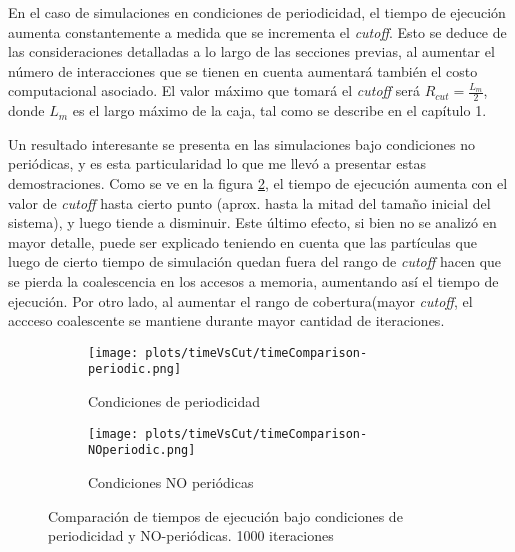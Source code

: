 En el caso de simulaciones en condiciones de periodicidad, el tiempo de ejecución aumenta constantemente a medida que se incrementa el \textit{cutoff}. 
Esto se deduce de las consideraciones detalladas a lo largo de las secciones previas, al aumentar el número de interacciones que se tienen en cuenta aumentará también el costo computacional asociado.
El valor máximo que tomará el \textit{cutoff} será $R_{cut}=\frac{L_m}{2}$, donde $L_m$ es el largo máximo de la caja, tal como se describe en el capítulo 1.

Un resultado interesante se presenta en las simulaciones bajo condiciones no periódicas, y es esta particularidad lo que me llevó a presentar estas demostraciones.
Como se ve en la figura \ref{time-vs-cut-NOperiodic}, el tiempo de ejecución aumenta con el valor de \textit{cutoff} hasta cierto punto (aprox. hasta la mitad del tamaño inicial del sistema), y luego tiende a disminuir.
Este último efecto, si bien no se analizó en mayor detalle, puede ser explicado teniendo en cuenta que las partículas que luego de cierto tiempo de simulación quedan fuera del rango de \textit{cutoff} 
hacen que se pierda la coalescencia en los accesos a memoria, aumentando así el tiempo de ejecución. 
Por otro lado, al aumentar el rango de cobertura(mayor \textit{cutoff}, el accceso coalescente se mantiene durante mayor cantidad de iteraciones.






\begin{figure}[htbp]
\centering
\begin{subfigure}[b]{\plotwidthtres}
   \texttt{[image: plots/timeVsCut/timeComparison-periodic.png]}
   \caption{Condiciones de periodicidad}
   \label{time-vs-cut-periodic}
 \end{subfigure}
\begin{subfigure}[b]{\plotwidthtres}
   \texttt{[image: plots/timeVsCut/timeComparison-NOperiodic.png]}
   \caption{Condiciones NO periódicas}
   \label{time-vs-cut-NOperiodic}
 \end{subfigure}
 \caption{Comparaci\'on de tiempos de ejecuci\'on bajo condiciones de periodicidad y NO-periódicas. 1000 iteraciones}
 \label{time-vs-cut}
\end{figure}


